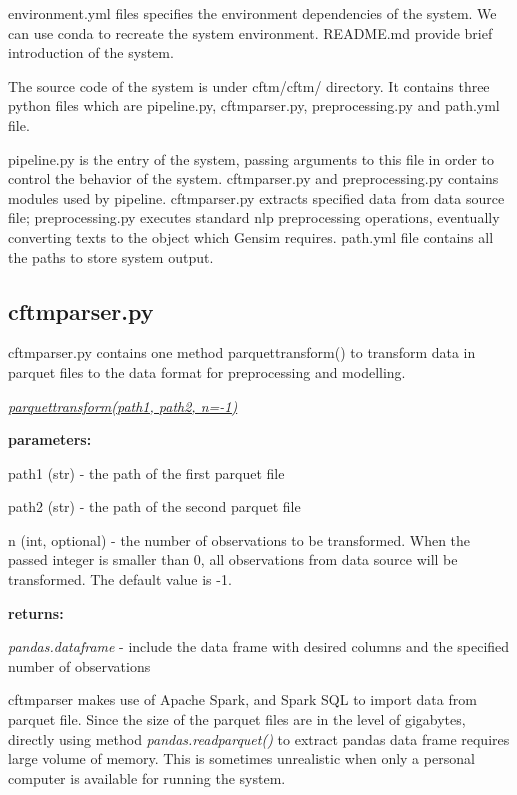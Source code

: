 \documentclass{article} %
\begin{document}
environment.yml files specifies the environment dependencies of the system. We can use conda to recreate the system environment. README.md provide brief introduction of the system.

The source code of the system is under cftm/cftm/ directory. It contains three python files which are pipeline.py, cftm\textunderscore{}parser.py, preprocessing.py and path.yml file.

pipeline.py is the entry of the system, passing arguments to this file in order to control the behavior of the system. cftm\textunderscore{}parser.py and preprocessing.py contains modules used by pipeline. cftm\textunderscore{}parser.py extracts specified data from data source file; preprocessing.py executes standard nlp preprocessing operations, eventually converting texts to the object which Gensim requires. path.yml file contains all the paths to store system output.

\subsection{cftm\textunderscore{}parser.py}
cftm\textunderscore{}parser.py contains one method parquet\textunderscore{}transform() to transform data in parquet files to the data format for preprocessing and modelling.

\underline{\textit{parquet\textunderscore{}transform(path1, path2, n=-1)}}

\textbf{parameters: }
\begin{compactitem}
      \item path1 (str) - the path of the first parquet file
      \item path2 (str) - the path of the second parquet file
      \item n (int, optional) - the number of observations to be transformed. When the passed integer is smaller than 0, all observations from data source will be transformed. The default value is -1.
\end{compactitem}

\textbf{returns:}
\begin{compactitem}
      \item \textit{pandas.dataframe} - include the data frame with desired columns and the specified number of observations
\end{compactitem}


cftm\textunderscore{}parser makes use of Apache Spark, and Spark SQL to import data from parquet file. Since the size of the parquet files are in the level of gigabytes, directly using method \textit{pandas.read\textunderscore{}parquet()} to extract pandas data frame requires large volume of memory. This is sometimes unrealistic when only a personal computer is available for running the system.
\end{document}
